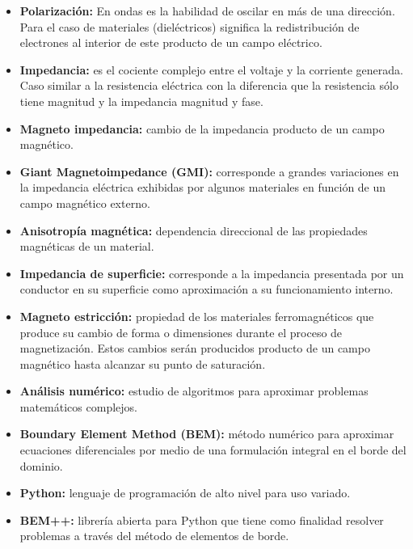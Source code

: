 \documentclass[11pt]{article}
\begin{document}
\begin{itemize}
	\item \textbf{Polarización:} En ondas es la habilidad de oscilar en más de una dirección. Para el caso de materiales (dieléctricos) significa la redistribución de electrones al interior de este producto de un campo eléctrico.
	\item \textbf{Impedancia:} es el cociente complejo entre el voltaje y la corriente generada. Caso similar a la resistencia eléctrica con la diferencia que la resistencia sólo tiene magnitud y la impedancia magnitud y fase.
	\item \textbf{Magneto impedancia:} cambio de la impedancia producto de un campo magnético.
	\item \textbf{Giant Magnetoimpedance (GMI):} corresponde a grandes variaciones en la impedancia eléctrica exhibidas por algunos materiales en función de un campo magnético externo.
	\item \textbf{Anisotropía magnética:} dependencia direccional de las propiedades magnéticas de un material.
	\item \textbf{Impedancia de superficie:} corresponde a la impedancia presentada por un conductor en su superficie como aproximación a su funcionamiento interno. 
	\item \textbf{Magneto estricción:} propiedad de los materiales ferromagnéticos que produce su cambio de forma o dimensiones durante el proceso de magnetización. Estos cambios serán producidos producto de un campo magnético hasta alcanzar su punto de saturación.
	\item \textbf{Análisis numérico:} estudio de algoritmos para aproximar problemas matemáticos complejos.
	\item \textbf{Boundary Element Method (BEM):} método numérico para aproximar ecuaciones diferenciales por medio de una formulación integral en el borde del dominio.
	\item \textbf{Python:} lenguaje de programación de alto nivel para uso variado.
	\item \textbf{BEM++:} librería abierta para Python que tiene como finalidad resolver problemas a través del método de elementos de borde.
	
\end{itemize}
\pagebreak
\setcounter{page}{1}  
\tableofcontents

\pagebreak
{}
\end{document}
